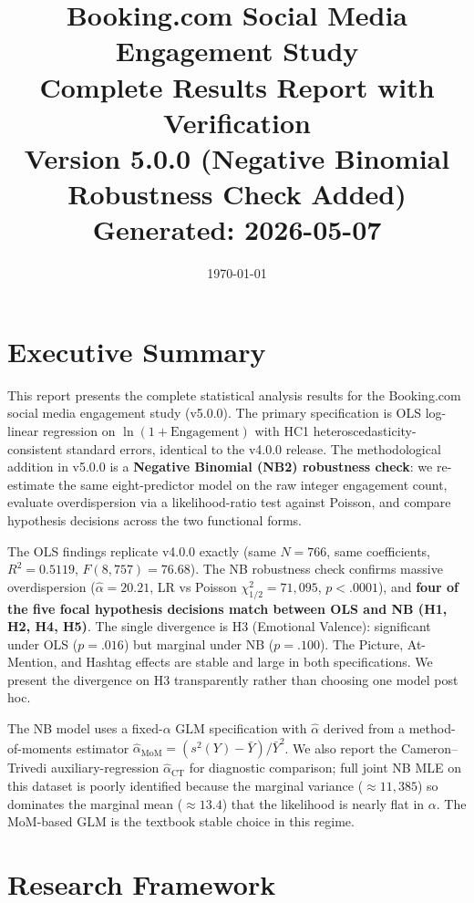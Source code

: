 \documentclass[12pt,a4paper]{article}
\title{Booking.com Social Media Engagement Study\\
Complete Results Report with Verification\\[0.5em]
\large Version 5.0.0 (Negative Binomial Robustness Check Added)\\[0.3em]
\small Generated: 2026-05-07}
\author{}
\date{\today}
\begin{document}
\maketitle
\tableofcontents
\newpage

\section*{Executive Summary}

This report presents the complete statistical analysis results for the Booking.com social media engagement study (v5.0.0). The primary specification is OLS log-linear regression on $\ln(1+\text{Engagement})$ with HC1 heteroscedasticity-consistent standard errors, identical to the v4.0.0 release. The methodological addition in v5.0.0 is a \textbf{Negative Binomial (NB2) robustness check}: we re-estimate the same eight-predictor model on the raw integer engagement count, evaluate overdispersion via a likelihood-ratio test against Poisson, and compare hypothesis decisions across the two functional forms.

The OLS findings replicate v4.0.0 exactly (same $N=766$, same coefficients, $R^2=0.5119$, $F(8,757)=76.68$). The NB robustness check confirms massive overdispersion ($\hat\alpha=20.21$, LR vs Poisson $\chi^2_{1/2}=71{,}095$, $p<.0001$), and \textbf{four of the five focal hypothesis decisions match between OLS and NB (H1, H2, H4, H5)}. The single divergence is H3 (Emotional Valence): significant under OLS ($p=.016$) but marginal under NB ($p=.100$). The Picture, At-Mention, and Hashtag effects are stable and large in both specifications. We present the divergence on H3 transparently rather than choosing one model post hoc.

The NB model uses a fixed-$\alpha$ GLM specification with $\hat\alpha$ derived from a method-of-moments estimator $\hat\alpha_{\text{MoM}}=(s^2(Y)-\bar Y)/\bar Y^2$. We also report the Cameron--Trivedi auxiliary-regression $\hat\alpha_{\text{CT}}$ for diagnostic comparison; full joint NB MLE on this dataset is poorly identified because the marginal variance ($\approx 11{,}385$) so dominates the marginal mean ($\approx 13.4$) that the likelihood is nearly flat in $\alpha$. The MoM-based GLM is the textbook stable choice in this regime.

\section{Research Framework}
\end{document}
